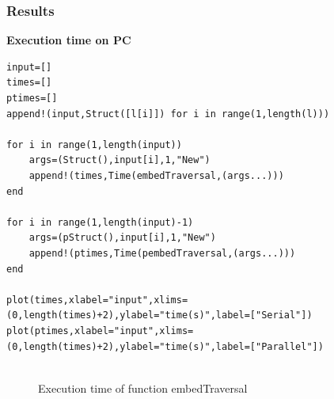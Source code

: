 \documentclass[a4paper,12pt]{article}
\begin{document}
\subsubsection{Results}
\textbf{Execution time on PC}
\begin{Verbatim}[fontsize=\footnotesize]
input=[]
times=[]
ptimes=[]
append!(input,Struct([l[i]]) for i in range(1,length(l)))

for i in range(1,length(input))
	args=(Struct(),input[i],1,"New")
	append!(times,Time(embedTraversal,(args...)))
end

for i in range(1,length(input)-1)
	args=(pStruct(),input[i],1,"New")
	append!(ptimes,Time(pembedTraversal,(args...)))
end

plot(times,xlabel="input",xlims=(0,length(times)+2),ylabel="time(s)",label=["Serial"])
plot(ptimes,xlabel="input",xlims=(0,length(times)+2),ylabel="time(s)",label=["Parallel"])


\end{Verbatim}
\begin{figure}[!h]
	\centering
	\caption{Execution time of function embedTraversal}
\end{figure}
\end{document}
